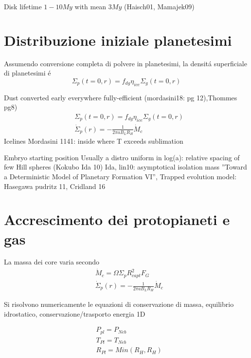 {Disk lifetime}
$1-10My$ with mean $3My$ (Haisch01, Mamajek09)


\section{Distribuzione iniziale planetesimi}
Assumendo conversione completa di polvere in planetesimi, la densit\'a superficiale di planetesimi \'e
\begin{equation}
\Sigma_p(t=0,r)=f_{dg}\eta_{ice}\Sigma_g(t=0,r)
\end{equation}

\begin{workout}
Dust converted early everywhere fully-efficient (mordasini18: pg 12),Thommes pg8)
\begin{align*}
&\Sigma_p(t=0,r)=f_{dg}\eta_{ice}\Sigma_g(t=0,r)\\
&\dot{\Sigma}_p(r)=-\frac{1}{2\pi aB_LR_H}\dot{M}_c
\end{align*}
Icelines Mordasini 1141: inside where T exceeds sublimation

{Embryo starting position}
Usually a distro uniform in log(a): relative spacing of few Hill spheres (Kokubo Ida 10)
Ida, lin10: asymptotical isolation mass ''Toward a Deterministic Model of Planetary Formation VI'',
Trapped evolution model: Hasegawa pudritz 11, Cridland 16

\end{workout}

\section{Accrescimento dei protopianeti e gas}

La massa dei core varia secondo
\begin{align}
&\dot{M}_c=\Omega\Sigma_pR^2_{capt}F_G\\
&\dot{\Sigma}_p(r)=-\frac{1}{2\pi aB_LR_H}\dot{M}_c
\end{align}

Si risolvono numericamente le equazioni di conservazione di massa, equilibrio idrostatico, conservazione/trasporto energia 1D

\begin{workout}
\begin{align}
&P_{pl}=P_{Neb}\\
&T_{Pl}=T_{Neb}\\
&R_{Pl}=Min(R_H,R_H)
\end{align}
\end{workout}


